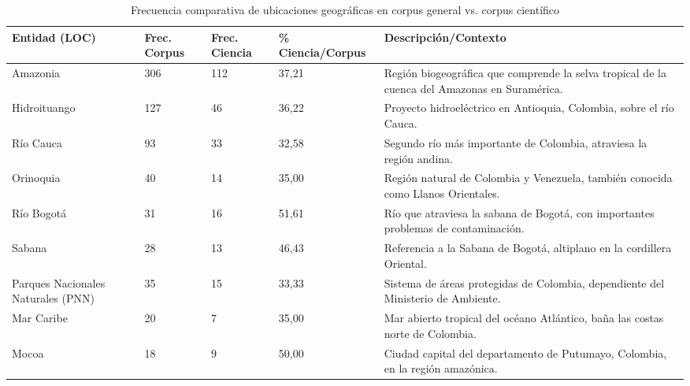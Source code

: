 \documentclass[11pt,a4paper]{article}
\begin{document}
	\begin{table}[H]
		\centering
		\caption{Frecuencia comparativa de ubicaciones geográficas en corpus general vs. corpus científico}
		\label{tab:ents_loc}
		\footnotesize 
		\begin{tabular}{p{3cm}P{2.2cm}P{2.2cm}P{2.2cm}p{5cm}}
			\toprule
			\textbf{Entidad (LOC)} & 
			\textbf{Frec. Corpus} & 
			\textbf{Frec. Ciencia} & 
			\textbf{\% Ciencia/Corpus} & 
			\textbf{Descripción/Contexto} \\
			\midrule
			Amazonia & 306 & 112 & 37,21 & Región biogeográfica que comprende la selva tropical de la cuenca del Amazonas en Suramérica. \\
			Hidroituango & 127 & 46 & 36,22 & Proyecto hidroeléctrico en Antioquia, Colombia, sobre el río Cauca. \\
			Río Cauca & 93 & 33 & 32,58 & Segundo río más importante de Colombia, atraviesa la región andina. \\
			Orinoquia & 40 & 14 & 35,00 & Región natural de Colombia y Venezuela, también conocida como Llanos Orientales. \\
			Río Bogotá & 31 & 16 & 51,61 & Río que atraviesa la sabana de Bogotá, con importantes problemas de contaminación. \\
			Sabana & 28 & 13 & 46,43 & Referencia a la Sabana de Bogotá, altiplano en la cordillera Oriental. \\
			Parques Nacionales Naturales (PNN) & 35 & 15 & 33,33 & Sistema de áreas protegidas de Colombia, dependiente del Ministerio de Ambiente. \\
			Mar Caribe & 20 & 7 & 35,00 & Mar abierto tropical del océano Atlántico, baña las costas norte de Colombia. \\
			Mocoa & 18 & 9 & 50,00 & Ciudad capital del departamento de Putumayo, Colombia, en la región amazónica. \\
			\bottomrule
		\end{tabular}
	\end{table}
	
	
\end{document}
